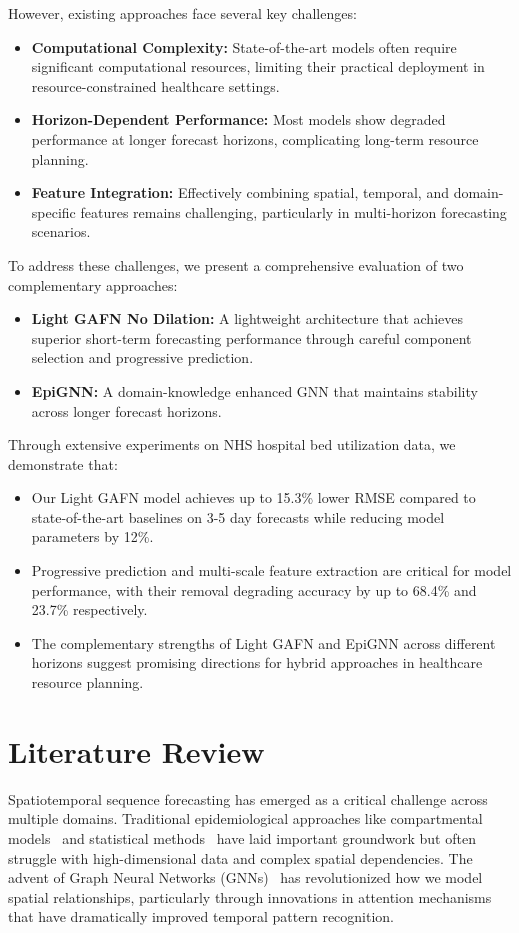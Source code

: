 \documentclass[lettersize, journal]{IEEEtran}
\begin{document}
However, existing approaches face several key challenges:
\begin{itemize}
\item \textbf{Computational Complexity:} State-of-the-art models often require significant computational resources, limiting their practical deployment in resource-constrained healthcare settings.
\item \textbf{Horizon-Dependent Performance:} Most models show degraded performance at longer forecast horizons, complicating long-term resource planning.
\item \textbf{Feature Integration:} Effectively combining spatial, temporal, and domain-specific features remains challenging, particularly in multi-horizon forecasting scenarios.
\end{itemize}

To address these challenges, we present a comprehensive evaluation of two complementary approaches:
\begin{itemize}
\item \textbf{Light GAFN No Dilation:} A lightweight architecture that achieves superior short-term forecasting performance through careful component selection and progressive prediction.
\item \textbf{EpiGNN:} A domain-knowledge enhanced GNN that maintains stability across longer forecast horizons.
\end{itemize}

Through extensive experiments on NHS hospital bed utilization data, we demonstrate that:
\begin{itemize}
\item Our Light GAFN model achieves up to 15.3\% lower RMSE compared to state-of-the-art baselines on 3-5 day forecasts while reducing model parameters by 12\%.
\item Progressive prediction and multi-scale feature extraction are critical for model performance, with their removal degrading accuracy by up to 68.4\% and 23.7\% respectively.
\item The complementary strengths of Light GAFN and EpiGNN across different horizons suggest promising directions for hybrid approaches in healthcare resource planning.
\end{itemize}

\section{Literature Review}
Spatiotemporal sequence forecasting has emerged as a critical challenge across multiple domains. Traditional epidemiological approaches like compartmental models~\cite{compartmentalmodel} and statistical methods~\cite{sirbasedmodel} have laid important groundwork but often struggle with high-dimensional data and complex spatial dependencies. The advent of Graph Neural Networks (GNNs)~\cite{gnn_survey} has revolutionized how we model spatial relationships, particularly through innovations in attention mechanisms~\cite{attention_mechanisms} that have dramatically improved temporal pattern recognition.
\end{document}
